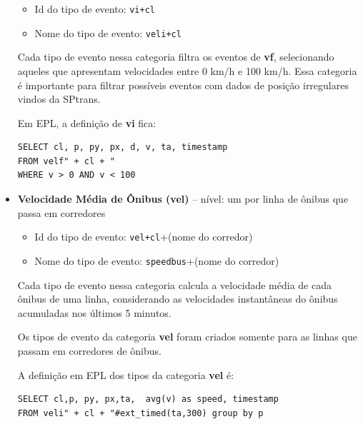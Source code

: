 \begin{itemize}
    \begin{itemize}
        \item Id do tipo de evento: \texttt{vi+cl} %
        \item Nome do tipo de evento: \texttt{veli+cl}%
    \end{itemize}
    Cada tipo de evento nessa categoria filtra os eventos de \textbf{vf}, selecionando aqueles que apresentam velocidades entre 0 km/h e 100 km/h. Essa categoria é importante para filtrar possíveis eventos com dados de posição irregulares vindos da SPtrans. 
    
    Em EPL, a definição de \textbf{vi} fica: 
\begin{verbatim}
SELECT cl, p, py, px, d, v, ta, timestamp 
FROM velf" + cl + " 
WHERE v > 0 AND v < 100
\end{verbatim}


    \item \textbf{Velocidade Média de Ônibus (vel)} -- nível: um por linha de ônibus que passa em corredores
    
    \begin{itemize}
        \item Id do tipo de evento: \texttt{vel+cl}+(nome do corredor) %
        \item Nome do tipo de evento: \texttt{speedbus}+(nome do corredor)
    \end{itemize}
 
    Cada tipo de evento nessa categoria calcula a velocidade média de cada ônibus de uma linha, considerando as velocidades instantâneas do ônibus acumuladas nos últimos 5 minutos. 
    
    Os tipos de evento da categoria \textbf{vel} foram criados somente para as linhas que passam em corredores de ônibus.%
    
    A definição em EPL dos tipos da categoria \textbf{vel} é:
\begin{verbatim}
SELECT cl,p, py, px,ta,  avg(v) as speed, timestamp 
FROM veli" + cl + "#ext_timed(ta,300) group by p
\end{verbatim}



\end{itemize}
